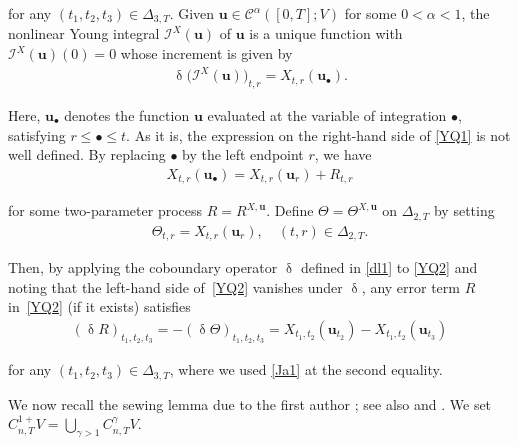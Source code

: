 \documentclass[letterpaper, 11pt,  reqno]{amsart}
\newcommand{\1}{\hspace{0.5mm}\text{I}\hspace{0.5mm}}
\newcommand{\I}{\mathcal{I}}
\newcommand{\noi}{\noindent}
\newcommand{\bul}{\bullet}
\newcommand{\CC}{\mathcal{C}}
\newcommand{\al}{\alpha}
\newcommand{\updl}{\updelta}
\newcommand{\Dl}{\Delta}
\newcommand{\g}{\gamma}
\newcommand{\uu}{\mathbf{u}}
\newcommand{\Ta}{\Theta}
\numberwithin{equation}{section}
\numberwithin{theorem}{section}
\begin{document}
\noi
for any $(t_1,t_2,t_3)\in \Dl_{3,T}$.
Given 
$\uu\in \CC^{\al}([0,T];V)$ for some $0 < \al < 1$, 
the nonlinear Young integral $\I^X(\uu)$ of $\uu$
is a unique function 
with $\I^X(\uu)(0) = 0$
whose increment is given by 
\begin{align}
\updl 
\big(\I^X(\uu)\big)_{t, r} 
= X_{t, r}(\uu_\bul).
\label{YQ1}
\end{align}

\noi
Here, $\uu_\bul$ denotes 
the function $\uu$ evaluated at the variable of integration
$\bul$, satisfying $r \le \bul \le  t$.
As it is, the expression on the right-hand side of \eqref{YQ1}
is not well defined.
By replacing $\bul$ by the left endpoint $r$, 
we have 
\begin{align}
X_{t, r}(\uu_\bul)
= X_{t, r}(\uu_r) + R_{t, r}
\label{YQ2}
\end{align}

\noi
for some two-parameter process $R = R^{X, \uu}$.
% 
Define  $\Theta = \Ta^{X, \uu}$ on $\Dl_{2,T}$
by setting
\begin{align}
\Theta_{t,r} = X_{t,r}(\uu_r), \quad (t,r)\in \Dl_{2,T}.
\label{Ja1a}
\end{align}


\noi
Then, 
by applying the coboundary operator $\updl$
defined in \eqref{dl1}
to \eqref{YQ2}
and noting that the left-hand side of~\eqref{YQ2} vanishes
under $\updl$, 
any error term $R$ in~\eqref{YQ2} (if it exists) satisfies
\begin{align}
(\updl R)_{t_1, t_2, t_3}
= - (\updl  \Theta)_{t_1, t_2, t_3}
=  X_{t_1, t_2}( \uu_{t_2}) - 
  X_{t_1, t_2}( \uu_{t_3})
\label{YQ3}
\end{align}

\noi
for any $(t_1, t_2, t_3) \in\Dl_{3, T}$, 
where we used 
 \eqref{Ja1} at the second equality.



We now recall 
the  sewing lemma due to the first author \cite{Gub04};
see also
\cite[Proposition~2.3, Corollaries  2.4 and  2.5]{GT10}
and  \cite[Lemma~4.2]{FH20}.
%
We set 
$C^{1+}_{n,T}V = \bigcup_{\g>1}C^\g_{n,T}V$.
\end{document}
